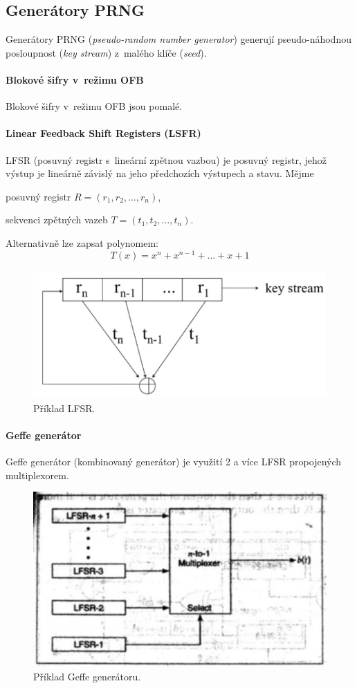 \subsection{Generátory PRNG}

Generátory PRNG (\textit{pseudo-random number generator}) generují pseudo-náhodnou pos\-loupnost (\textit{key stream}) z~malého klíče (\textit{seed}).

\paragraph*{Blokové šifry v~režimu OFB} Blokové šifry v~režimu OFB jsou pomalé.

\paragraph*{Linear Feedback Shift Registers (LSFR)} LFSR (posuvný registr s~lineární zpětnou vazbou) je posuvný registr, jehož výstup je lineárně závislý na jeho předchozích výstupech a stavu. Mějme \begin{compactitem}
    \item posuvný registr $R = (r_1, r_2, \dots, r_n)$,
    \item sekvenci zpětných vazeb $T = (t_1, t_2, \dots, t_n)$.
\end{compactitem}

\noindent Alternativně lze zapsat polynomem: $$
T(x) = x^n + x^{n-1} + \ldots + x + 1
$$

\begin{figure}[H]
    \centering
    \includegraphics[width=0.6\linewidth]{lfsr.png}
    \caption{Příklad LFSR.}
\end{figure}

\paragraph*{Geffe generátor} Geffe generátor (kombinovaný generátor) je využití 2 a více LFSR propojených multiplexorem.

\begin{figure}[H]
    \centering
    \includegraphics[width=0.75\linewidth]{geffe.png}
    \caption{Příklad Geffe generátoru.}
\end{figure}

